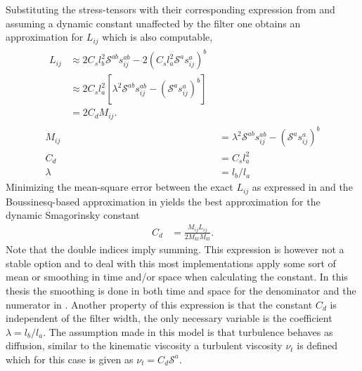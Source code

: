 Substituting the stress-tensors with their corresponding expression 
from  and assuming a dynamic constant unaffected by the filter 
one obtains an approximation for $L_{ij}$ which is also computable,
\begin{align}
    \begin{split}
L_{ij} &\approx 2C_s l_b^2 \mathcal{S}^{ab} s^{ab}_{ij}
        -2 (C_s l_a^2 \mathcal{S}^a s^a_{ij})^b\\
        &\approx 2C_sl_a^2[\lambda^2\mathcal{S}^{ab}s^{ab}_{ij} 
        - (\mathcal{S}^{a}s^{a}_{ij})^b]\\
        &= 2C_d M_{ij}.
        \label{eq:lillystress}
    \end{split} \\
    M_{ij} &= \lambda^{2}\mathcal{S}^{ab}s_{ij}^{ab} - (\mathcal{S}^as_{ij}^a)^b\\
        C_d &= C_sl_a^2\\
        \lambda &= l_b/l_a
    \label{eq:dynsmagderivation}
\end{align}
Minimizing the mean-square error between the exact $L_{ij}$ as expressed in 
and the Boussinesq-based approximation 
in  yields the best approximation 
for the dynamic Smagorinsky constant 
%
\begin{align}
    C_d &= \frac{M_{ij}L_{ij}}{2M_{kl}M_{kl}}.
    \label{eq:dynsmag}
\end{align}
%
Note that the double indices imply summing. This expression is however not a 
stable option and to deal with this most implementations apply some sort of mean or smoothing 
in time and/or space when calculating the constant. In this thesis the smoothing is done in 
both time and space for the denominator and the numerator in . Another property 
of this expression is that the constant $C_d$ is 
independent of the filter width, the only necessary variable is the coefficient $\lambda = l_b/l_a$.
The assumption made in this model is that turbulence behaves 
as diffusion, similar to the kinematic viscosity a turbulent viscosity $\nu_t$ is defined which for this case is given as 
$\nu_t = C_d\mathcal{S}^a$.

